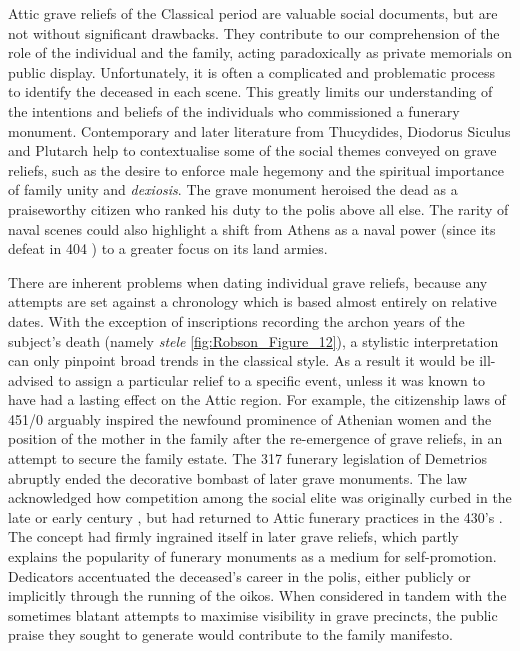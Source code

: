 Attic grave reliefs of the Classical period are valuable social documents, but are not without significant drawbacks. They contribute to our comprehension of the role of the individual and the family, acting paradoxically as private memorials on public display. Unfortunately, it is often a complicated and problematic process to identify the deceased in each scene. This greatly limits our understanding of the intentions and beliefs of the individuals who commissioned a funerary monument. Contemporary and later literature from Thucydides, Diodorus Siculus and Plutarch help to contextualise some of the social themes conveyed on grave reliefs, such as the desire to enforce male hegemony and the spiritual importance of family unity and \textit{dexiosis}. The grave monument heroised the dead as a praiseworthy citizen who ranked his duty to the polis above all else. The rarity of naval scenes could also highlight a shift from Athens as a naval power (since its defeat in 404 \BC) to a greater focus on its land armies.

There are inherent problems when dating individual grave reliefs, because any attempts are set against a chronology which is based almost entirely on relative dates. With the exception of inscriptions recording the archon years of the subject’s death (namely \textit{stele} \ref{fig:Robson_Figure_12}), a stylistic interpretation can only pinpoint broad trends in the classical style. As a result it would be ill-advised to assign a particular relief to a specific event, unless it was known to have had a lasting effect on the Attic region. For example, the citizenship laws of 451/0 \BC arguably inspired the newfound prominence of Athenian women and the position of the mother in the family after the re-emergence of grave reliefs, in an attempt to secure the family estate. The 317 \BC funerary legislation of Demetrios abruptly ended the decorative bombast of later grave monuments. The law acknowledged how competition among the social elite was originally curbed in the late  or early  century \BC, but had returned to Attic funerary practices in the 430’s \BC. The concept had firmly ingrained itself in later grave reliefs, which partly explains the popularity of funerary monuments as a medium for self-promotion. Dedicators accentuated the deceased’s career in the polis, either publicly or implicitly through the running of the oikos. When considered in tandem with the sometimes blatant attempts to maximise visibility in grave precincts, the public praise they sought to generate would contribute to the family manifesto.

